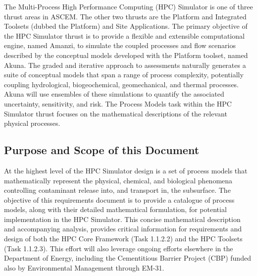 The Multi-Process High Performance Computing (HPC) Simulator is one of
three thrust areas in ASCEM.  The other two thrusts are the Platform
and Integrated Toolsets (dubbed the Platform) and Site Applications.
The primary objective of the HPC Simulator thrust is to provide a
flexible and extensible computational engine, named Amanzi, to
simulate the coupled processes and flow scenarios described by the
conceptual models developed with the Platform toolset, named Akuna.
The graded and iterative approach to assessments naturally generates a
suite of conceptual models that span a range of process complexity,
potentially coupling hydrological, biogeochemical, geomechanical, and
thermal processes.  Akuna will use ensembles of these simulations to
quantify the associated uncertainty, sensitivity, and risk.  The
Process Models task within the HPC Simulator thrust focuses on the
mathematical descriptions of the relevant physical processes.

\subsection{Purpose and Scope of this Document}

At the highest level of the HPC Simulator design is a set of process
models that mathematically represent the physical, chemical, and
biological phenomena controlling contaminant release into, and
transport in, the subsurface.  The objective of this requirements
document is to provide a catalogue of process models, along with their
detailed mathematical formulation, for potential implementation in the
HPC Simulator.  This concise mathematical description and accompanying
analysis, provides critical information for requirements and design of
both the HPC Core Framework (Task 1.1.2.2) and the HPC Toolsets (Task
1.1.2.3). This effort will also leverage ongoing efforts elsewhere in
the Department of Energy, including the Cementitious Barrier Project
(CBP) funded also by Environmental Management through EM-31.

